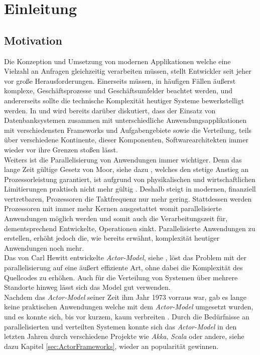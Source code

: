 \chapter{Einleitung}\label{cha:introduction}
\section{Motivation}\label{sec:introduction:motivation}
Die Konzeption und Umsetzung von modernen Applikationen welche eine Vielzahl an Anfragen gleichzeitig verarbeiten müssen, stellt Entwickler seit jeher vor große Herausforderungen. Einerseits müssen, in häufigen Fällen äußerst komplexe, Geschäftsprozesse und Geschäftsumfelder beachtet werden, und andererseits sollte die technische Komplexität heutiger Systeme bewerkstelligt werden. In \cite{Vernon2015ReactiveAkka} und \cite{Evans2004Domain-drivenSoftware} wird bereits darüber diskutiert, dass der Einsatz von Datenbanksystemen zusammen mit unterschiedliche Anwendungsapplikationen mit verschiedensten Frameworks und Aufgabengebiete sowie die Verteilung, teils über verschiedene Kontinente, dieser Komponenten, Softwarearchitekten immer wieder vor ihre Grenzen stoßen lässt. \\
Weiters ist die Parallelisierung von Anwendungen immer wichtiger. Denn das lange Zeit gültige Gesetz von Moor, siehe dazu \cite{moore1965moore}, welches den stetige Anstieg an Prozessorleistung garantiert, ist aufgrund von physikalischen und wirtschaftlichen Limitierungen praktisch nicht mehr gültig \citep{mann2000end}. Deshalb steigt in modernen, finanziell vertretbaren, Prozessoren die Taktfrequenz nur mehr gering. Stattdessen werden Prozessoren mit immer mehr Kernen ausgestattet womit parallelisierte Anwendungen möglich werden und somit auch die Verarbeitungszeit für, dementsprechend Entwickelte, Operationen sinkt. Parallelisierte Anwendungen zu erstellen, erhöht jedoch die, wie bereits erwähnt, komplexität heutiger Anwendungen noch mehr. \\
Das von Carl Hewitt entwickelte \textit{Actor-Model}, siehe \cite{Hewitt1973AIntelligence}, löst das Problem mit der parallelisierung auf eine äußert effiziente Art, ohne dabei die Komplexität des Quellcodes zu erhöhen. Auch für die Verteilung von Systemen über mehrere Standorte hinweg lässt sich das Model gut verwenden. \\
Nachdem das \textit{Actor-Model} seiner Zeit ihm Jahr 1973 vorraus war, gab es lange keine praktischen Anwendungen welche mit dem \textit{Actor-Model} umgesetzt wurden, und es konnte sich, bis vor kurzem, kaum verbreiten \citep{mackay1997has}. Durch die Bedürfnisse an parallelisierten und verteilten Systemen konnte sich das \textit{Actor-Model} in den letzten Jahren durch verschiedene Projekte wie \textit{Akka}, \textit{Scala} oder andere, siehe dazu Kapitel \ref{sec:ActorFrameworks}, wieder an popularität gewinnen.

